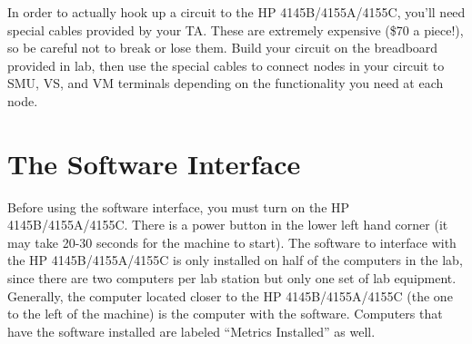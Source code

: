 \documentclass{article}
\begin{document}
In order to actually hook up a circuit to the HP 4145B/4155A/4155C, you'll need special cables provided by your TA. These are extremely expensive (\$70 a piece!), so be careful not to break or lose them. Build your circuit on the breadboard provided in lab, then use the special cables to connect nodes in your circuit to SMU, VS, and VM terminals depending on the functionality you need at each node.

\section{The Software Interface}

Before using the software interface, you must turn on the HP 4145B/4155A/4155C. There is a power button in the lower left hand corner (it may take 20-30 seconds for the machine to start). The software to interface with the HP 4145B/4155A/4155C is only installed on half of the computers in the lab, since there are two computers per lab station but only one set of lab equipment. Generally, the computer located closer to the HP 4145B/4155A/4155C (the one to the left of the machine) is the computer with the software. Computers that have the software installed are labeled ``Metrics Installed'' as well.
\end{document}
